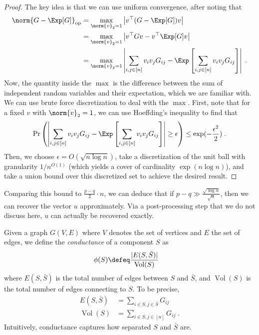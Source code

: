 \begin{proof}
The key idea is that we can use uniform convergence, after noting that
\begin{align}
    \norm{ G - \Exp[G] }_{\mathrm{op}} &= \max_{\norm{ v }_2 = 1} \left\vert v^\top (G - \Exp[G]) v \right\vert \\
    &= \max_{\norm{ v }_2 = 1} \left\vert v^\top G v - v^\top \Exp[G] v \right\vert \\
    &= \max_{\norm{ v }_2 = 1} \left\vert \sum_{i, j \in [n]} v_i v_j G_{ij} - \Exp \left[ \sum_{i, j \in [n]} v_i v_j G_{ij} \right] \right\vert \;.
\end{align}
Now, the quantity inside the $\max$ is the difference between the sum of independent random variables and their expectation, which we are familiar with. We can use brute force discretization to deal with the $\max$. First, note that for a fixed $v$ with $\norm{ v }_2 = 1$, we can use Hoeffding's inequality to find that
\begin{align}
    \Pr \left( \left\vert \sum_{i, j \in [n]} v_i v_j G_{ij} - \Exp \left[ \sum_{i, j \in [n]} v_i v_j G_{ij} \right] \right\vert \geq \epsilon \right) \leq \exp(-\frac{\epsilon^2}{2}) \;.
\end{align}
Then, we choose $\epsilon = O(\sqrt{n \log n})$, take a discretization of the unit ball with granularity $1/n^{O(1)}$ (which yields a cover of cardinality  $\exp(n \log n)$), and take a union bound over this discretized set to achieve the desired result.
\end{proof}

\begin{remark}
Comparing this bound to $\frac{p - q}{2} \cdot n$, we can deduce that if $p - q \gg \frac{\sqrt{\log n}}{\sqrt{n}}$, then we can recover the vector $u$ approximately. Via a post-processing step that we do not discuss here, $u$ can actually be recovered exactly. 
\end{remark}



Given a graph $G(V, E)$ where $V$ denotes the set of vertices and $E$ the set of edges, we define the {\it conductance} of a component $S$ as
\begin{align}
    \phi(S) &\defeq \frac{\vert E(S, \bar{S}) \vert}{\operatorname{Vol}(S)}
\end{align}
where $E(S, \bar{S})$ is the total number of edges between $S$ and $\bar{S}$, and $\operatorname{Vol}(S)$ is the total number of edges connecting to $S$. To be precise,
\begin{align}
    E(S, \bar{S}) &= \sum_{i \in S, j \in \bar{S}} G_{ij} \\
    \operatorname{Vol}(S) &= \sum_{i \in S, j \in [n]} G_{ij} \;.
\end{align}
Intuitively, conductance captures how separated $S$ and $\bar{S}$ are. 

